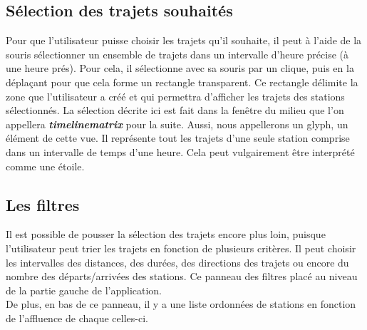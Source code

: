 \documentclass[12pt]{article}
\begin{document}
		\subsection{Sélection des trajets souhaités}
		Pour que l'utilisateur puisse choisir les trajets qu'il souhaite, il peut à l'aide de la
		souris sélectionner un ensemble de trajets dans un intervalle d'heure précise (à une
		heure prés). Pour cela, il sélectionne avec sa souris par un clique, puis en la 
		déplaçant pour que cela forme un rectangle transparent. Ce rectangle délimite la zone
		que l'utilisateur a créé et qui permettra d'afficher les trajets des stations
		sélectionnés. La sélection décrite ici est fait dans la fenêtre du milieu que l'on
		appellera \textbf{\textit{timelinematrix}} pour la suite. Aussi, nous appellerons
		un glyph, un élément de cette vue. Il représente tout les trajets d'une seule station
		comprise dans un intervalle de temps d'une heure. Cela peut vulgairement être interprété
		comme une étoile.
		
		\subsection{Les filtres}
		Il est possible de pousser la sélection des trajets encore plus loin, puisque l'utilisateur
		peut trier les trajets en fonction de plusieurs critères. Il peut choisir les intervalles
		des distances, des durées, des directions des trajets ou encore du nombre des
		départs/arrivées des stations. Ce panneau des filtres placé au niveau de la partie gauche
		de l'application.\\
		De plus, en bas de ce panneau, il y a une liste ordonnées de stations en fonction
		de l'affluence de chaque celles-ci.
	
\newpage
\end{document}

